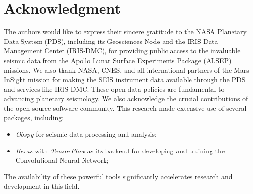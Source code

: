 \documentclass[conference]{IEEEtran}
\begin{document}
\section*{Acknowledgment}
The authors would like to express their sincere gratitude to the NASA Planetary Data System (PDS), including its
Geosciences Node and the IRIS Data Management Center (IRIS-DMC), for providing public access to the invaluable seismic
data from the Apollo Lunar Surface Experiments Package (ALSEP) missions. We also thank NASA, CNES, and all international
partners of the Mars InSight mission for making the SEIS instrument data available through the PDS and services like
IRIS-DMC. These open data policies are fundamental to advancing planetary seismology. We also acknowledge the crucial
contributions of the open-source software community. This research made extensive use of several packages, including:
\begin{itemize}
\item \textit{Obspy} \cite{Beyreuther2010} for seismic data processing and analysis;
\item \textit{Keras} \cite{Chollet2021} with \textit{TensorFlow} \cite{Abadi2016} as its backend for developing and
training the Convolutional Neural Network;
\end{itemize}
The availability of these powerful tools significantly accelerates research and development in this field.
\end{document}
